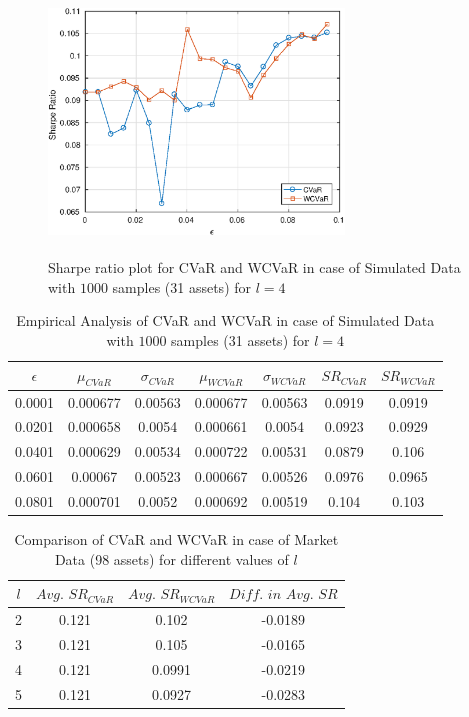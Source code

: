 \documentclass[12pt]{article}
\numberwithin{equation}{section}
\begin{document}
\begin{figure}[!h]
\centering
\includegraphics[height=7.0cm,width=0.7\textwidth]{CVaR/bse30_simulated/sr_1000_4.eps}
\caption{Sharpe ratio plot for CVaR and WCVaR in case of Simulated Data with $1000$ samples (31 assets) for $l=4$}
\label{fig:6.3}
\end{figure}

\begin{table}[!h]
\centering
\captionsetup{justification=centering}
\begin{tabular}{||c|c|c|c|c|c|c||}
\hline
$\epsilon$ & $\mu_{CVaR}$ & $\sigma_{CVaR}$ & $\mu_{WCVaR}$ & $\sigma_{WCVaR}$ & $SR_{CVaR}$ & $SR_{WCVaR}$\\
\hline
0.0001 & 0.000677 & 0.00563 & 0.000677 & 0.00563 & 0.0919 & 0.0919 \\
0.0201 & 0.000658 & 0.0054 & 0.000661 & 0.0054 & 0.0923 & 0.0929 \\
0.0401 & 0.000629 & 0.00534 & 0.000722 & 0.00531 & 0.0879 & 0.106 \\
0.0601 & 0.00067 & 0.00523 & 0.000667 & 0.00526 & 0.0976 & 0.0965 \\
0.0801 & 0.000701 & 0.0052 & 0.000692 & 0.00519 & 0.104 & 0.103 \\
\hline
\end{tabular}
\caption{Empirical Analysis of CVaR and WCVaR in case of Simulated Data with $1000$ samples (31 assets) for $l=4$}
\label{tab:6.3}
\end{table}

\begin{table}[!h]
\centering
\captionsetup{justification=centering}
\begin{tabular}{||c|c|c|c||}
\hline
$l$ & $Avg. \, \, SR_{CVaR}$ & $Avg. \, \, SR_{WCVaR}$ & $Diff. \, \, in \, \, Avg. \, \, SR$ \\
\hline
2 & 0.121 & 0.102 & -0.0189 \\
3 & 0.121 & 0.105 & -0.0165 \\
4 & 0.121 & 0.0991 & -0.0219 \\
5 & 0.121 & 0.0927 & -0.0283 \\
\hline
\end{tabular}
\caption{Comparison of CVaR and WCVaR in case of Market Data (98 assets) for different values of $l$}
\label{avgtab:6.4}
\end{table}
\end{document}
